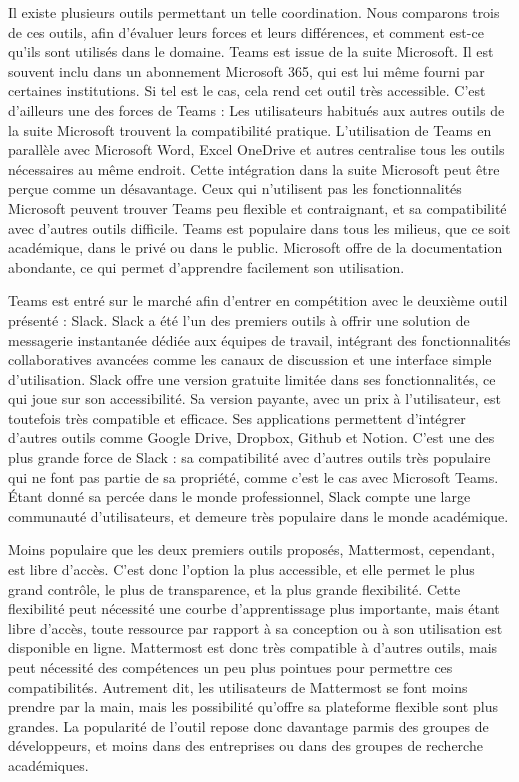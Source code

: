 \documentclass[
  letterpaper,
  DIV=11,
  numbers=noendperiod]{scrreprt}
\begin{document}
Il existe plusieurs outils permettant un telle coordination. Nous
comparons trois de ces outils, afin d'évaluer leurs forces et leurs
différences, et comment est-ce qu'ils sont utilisés dans le domaine.
Teams est issue de la suite Microsoft. Il est souvent inclu dans un
abonnement Microsoft 365, qui est lui même fourni par certaines
institutions. Si tel est le cas, cela rend cet outil très accessible.
C'est d'ailleurs une des forces de Teams : Les utilisateurs habitués aux
autres outils de la suite Microsoft trouvent la compatibilité pratique.
L'utilisation de Teams en parallèle avec Microsoft Word, Excel OneDrive
et autres centralise tous les outils nécessaires au même endroit. Cette
intégration dans la suite Microsoft peut être perçue comme un
désavantage. Ceux qui n'utilisent pas les fonctionnalités Microsoft
peuvent trouver Teams peu flexible et contraignant, et sa compatibilité
avec d'autres outils difficile. Teams est populaire dans tous les
milieus, que ce soit académique, dans le privé ou dans le public.
Microsoft offre de la documentation abondante, ce qui permet d'apprendre
facilement son utilisation.

Teams est entré sur le marché afin d'entrer en compétition avec le
deuxième outil présenté : Slack. Slack a été l'un des premiers outils à
offrir une solution de messagerie instantanée dédiée aux équipes de
travail, intégrant des fonctionnalités collaboratives avancées comme les
canaux de discussion et une interface simple d'utilisation. Slack offre
une version gratuite limitée dans ses fonctionnalités, ce qui joue sur
son accessibilité. Sa version payante, avec un prix à l'utilisateur, est
toutefois très compatible et efficace. Ses applications permettent
d'intégrer d'autres outils comme Google Drive, Dropbox, Github et
Notion. C'est une des plus grande force de Slack : sa compatibilité avec
d'autres outils très populaire qui ne font pas partie de sa propriété,
comme c'est le cas avec Microsoft Teams. Étant donné sa percée dans le
monde professionnel, Slack compte une large communauté d'utilisateurs,
et demeure très populaire dans le monde académique.

Moins populaire que les deux premiers outils proposés, Mattermost,
cependant, est libre d'accès. C'est donc l'option la plus accessible, et
elle permet le plus grand contrôle, le plus de transparence, et la plus
grande flexibilité. Cette flexibilité peut nécessité une courbe
d'apprentissage plus importante, mais étant libre d'accès, toute
ressource par rapport à sa conception ou à son utilisation est
disponible en ligne. Mattermost est donc très compatible à d'autres
outils, mais peut nécessité des compétences un peu plus pointues pour
permettre ces compatibilités. Autrement dit, les utilisateurs de
Mattermost se font moins prendre par la main, mais les possibilité
qu'offre sa plateforme flexible sont plus grandes. La popularité de
l'outil repose donc davantage parmis des groupes de développeurs, et
moins dans des entreprises ou dans des groupes de recherche académiques.
\end{document}

